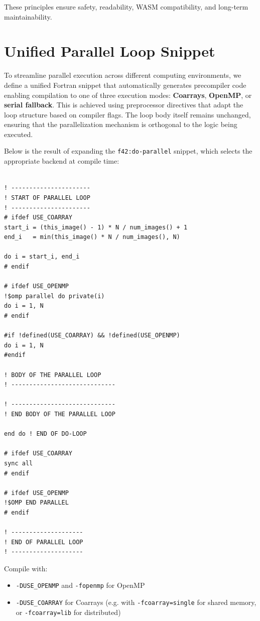 \documentclass{article}
\begin{document}
These principles ensure safety, readability, WASM compatibility, and long-term maintainability.

\section{Unified Parallel Loop Snippet}

To streamline parallel execution across different computing environments, we
define a unified Fortran snippet that automatically generates precompiler code
enabling compilation to one of three execution modes: \textbf{Coarrays},
\textbf{OpenMP}, or \textbf{serial fallback}. This is achieved using
preprocessor directives that adapt the loop structure based on compiler flags.
The loop body itself remains unchanged, ensuring that the parallelization
mechanism is orthogonal to the logic being executed.

Below is the result of expanding the \texttt{f42:do-parallel} snippet, which
selects the appropriate backend at compile time:

\begin{verbatim}

! ----------------------
! START OF PARALLEL LOOP
! ----------------------
# ifdef USE_COARRAY
start_i = (this_image() - 1) * N / num_images() + 1
end_i   = min(this_image() * N / num_images(), N)

do i = start_i, end_i
# endif

# ifdef USE_OPENMP
!$omp parallel do private(i)
do i = 1, N
# endif

#if !defined(USE_COARRAY) && !defined(USE_OPENMP)
do i = 1, N
#endif

! BODY OF THE PARALLEL LOOP
! -----------------------------

! -----------------------------
! END BODY OF THE PARALLEL LOOP

end do ! END OF DO-LOOP

# ifdef USE_COARRAY
sync all
# endif

# ifdef USE_OPENMP
!$OMP END PARALLEL
# endif

! --------------------
! END OF PARALLEL LOOP
! --------------------
\end{verbatim}

Compile with:
\begin{itemize}
  \item \texttt{-DUSE\_OPENMP} and \texttt{-fopenmp} for OpenMP
  \item \texttt{-DUSE\_COARRAY} for Coarrays (e.g. with
    \texttt{-fcoarray=single} for shared memory, or \texttt{-fcoarray=lib} for
    distributed)
\end{itemize}
\end{document}

